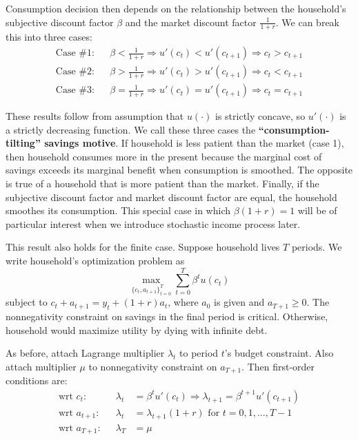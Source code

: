 \documentclass[11pt]{article}
\begin{document}
Consumption decision then depends on the relationship between the household's subjective discount factor $\beta$ and the market discount factor $\frac{1}{1+r}$. We can break this into three cases:
\begin{align*}
    \text{Case \#1:} && \beta < \frac{1}{1+r} \Rightarrow u'(c_t) < u'(c_{t+1}) \Rightarrow c_t > c_{t+1} \\
    \text{Case \#2:} && \beta > \frac{1}{1+r} \Rightarrow u'(c_t) > u'(c_{t+1}) \Rightarrow c_t < c_{t+1} \\
    \text{Case \#3:} && \beta = \frac{1}{1+r} \Rightarrow u'(c_t) = u'(c_{t+1}) \Rightarrow c_t = c_{t+1}
\end{align*}

These results follow from assumption that $u(\cdot)$ is strictly concave, so $u'(\cdot)$ is a strictly decreasing function. We call these three cases the \textbf{``consumption-tilting'' savings motive}. If household is less patient than the market (case 1), then household consumes more in the present because the marginal cost of savings exceeds its marginal benefit when consumption is smoothed. The opposite is true of a household that is more patient than the market. Finally, if the subjective discount factor and market discount factor are equal, the household smoothes its consumption. This special case in which $\beta(1+r) = 1$ will be of particular interest when we introduce stochastic income process later.

This result also holds for the finite case. Suppose household lives $T$ periods. We write household's optimization problem as $$\max_{\{c_t, a_{t+1}\}_{t=0}^T} \sum_{t=0}^T \beta^t u(c_t)$$ subject to $c_t + a_{t+1} = y_t + (1+r)a_t$, where $a_0$ is given and $a_{T+1} \geq 0$. The nonnegativity constraint on savings in the final period is critical. Otherwise, household would maximize utility by dying with infinite debt.

As before, attach Lagrange multiplier $\lambda_t$ to period $t$'s budget constraint. Also attach multiplier $\mu$ to nonnegativity constraint on $a_{T+1}$. Then first-order conditions are:
\begin{align*}
    \text{wrt $c_t$:} && \lambda_t &= \beta^t u'(c_t) \Rightarrow \lambda_{t+1} = \beta^{t+1} u'(c_{t+1}) \\ 
    \text{wrt $a_{t+1}$:} && \lambda_t &= \lambda_{t+1}(1+r) \text{ for $t=0,1,\dots,T-1$} \\
    \text{wrt $a_{T+1}$:} && \lambda_T &= \mu
\end{align*}
\end{document}
